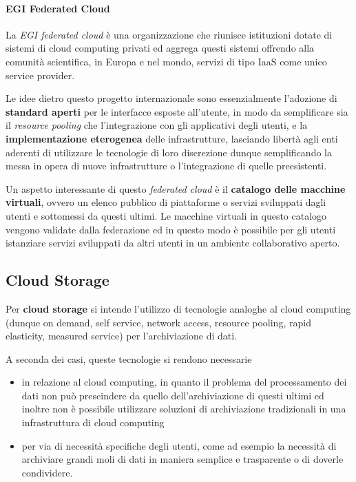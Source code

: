 \documentclass[italian,]{article}
\providecommand{\tightlist}{%
  \setlength{\itemsep}{0pt}\setlength{\parskip}{0pt}}
\let\oldparagraph\paragraph
\renewcommand{\paragraph}[1]{\oldparagraph{#1}\mbox{}}
\begin{document}
\paragraph{EGI Federated Cloud}\label{egi-federated-cloud}

La \emph{EGI federated cloud} è una organizzazione che riunisce
istituzioni dotate di sistemi di cloud computing privati ed aggrega
questi sistemi offrendo alla comunità scientifica, in Europa e nel
mondo, servizi di tipo IaaS come unico service provider.

Le idee dietro questo progetto internazionale sono essenzialmente
l'adozione di \textbf{standard aperti} per le interfacce esposte
all'utente, in modo da semplificare sia il \emph{resource pooling} che
l'integrazione con gli applicativi degli utenti, e la
\textbf{implementazione eterogenea} delle infrastrutture, lasciando
libertà agli enti aderenti di utilizzare le tecnologie di loro
discrezione dunque semplificando la messa in opera di nuove
infrastrutture o l'integrazione di quelle preesistenti.

Un aspetto interessante di questo \emph{federated cloud} è il
\textbf{catalogo delle macchine virtuali}, ovvero un elenco pubblico di
piattaforme o servizi sviluppati dagli utenti e sottomessi da questi
ultimi. Le macchine virtuali in questo catalogo vengono validate dalla
federazione ed in questo modo è possibile per gli utenti istanziare
servizi sviluppati da altri utenti in un ambiente collaborativo aperto.

\subsection{Cloud Storage}\label{cloud-storage}

Per \textbf{cloud storage} si intende l'utilizzo di tecnologie analoghe
al cloud computing (dunque on demand, self service, network access,
resource pooling, rapid elasticity, measured service) per
l'archiviazione di dati.

A seconda dei casi, queste tecnologie si rendono necessarie

\begin{itemize}
\tightlist
\item
  in relazione al cloud computing, in quanto il problema del
  processamento dei dati non può prescindere da quello
  dell'archiviazione di questi ultimi ed inoltre non è possibile
  utilizzare soluzioni di archiviazione tradizionali in una
  infrastruttura di cloud computing
\item
  per via di necessità specifiche degli utenti, come ad esempio la
  necessità di archiviare grandi moli di dati in maniera semplice e
  trasparente o di doverle condividere.
\end{itemize}
\end{document}
